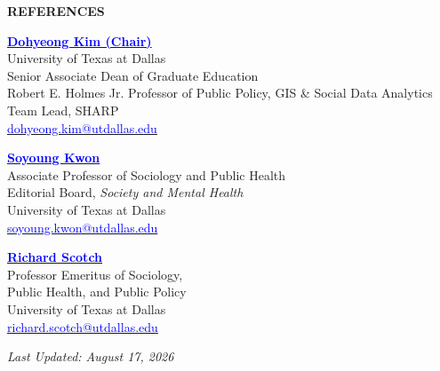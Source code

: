 \documentclass[11pt, letterpaper]{article}
\begin{document}
\vspace{1em}
\noindent\hrulefill
\begin{center}
    \textbf{REFERENCES}
\end{center}

\begin{minipage}[t]{0.48\textwidth}
    \raggedright
    \textbf{\href{https://profiles.utdallas.edu/dohyeong.kim}{\textcolor{blue}{Dohyeong Kim (Chair)}}} \\
    University of Texas at Dallas \\
    Senior Associate Dean of Graduate Education \\
    Robert E. Holmes Jr. Professor of Public Policy, GIS \& Social Data Analytics \\
    Team Lead, SHARP \\
    \href{mailto:dohyeong.kim@utdallas.edu}{\textcolor{blue}{dohyeong.kim@utdallas.edu}}
\end{minipage}
\hfill
\begin{minipage}[t]{0.48\textwidth}
    \raggedright
    \textbf{\href{https://profiles.utdallas.edu/soyoung.kwon}{\textcolor{blue}{Soyoung Kwon}}} \\
    Associate Professor of Sociology and Public Health \\
    Editorial Board, \textit{Society and Mental Health} \\
    University of Texas at Dallas \\
    \href{mailto:soyoung.kwon@utdallas.edu}{\textcolor{blue}{soyoung.kwon@utdallas.edu}}
\end{minipage}

\vspace{1.5em}

\begin{minipage}[t]{0.48\textwidth}
    \raggedright
    \textbf{\href{https://profiles.utdallas.edu/richard.scotch}{\textcolor{blue}{Richard Scotch}}} \\
    Professor Emeritus of Sociology, \\
    Public Health, and Public Policy \\
    University of Texas at Dallas \\
    \href{mailto:richard.scotch@utdallas.edu}{\textcolor{blue}{richard.scotch@utdallas.edu}}
\end{minipage}

\vspace{1em}
\begin{center}
    \textit{Last Updated: August 17, 2026}
\end{center}
\end{document}
